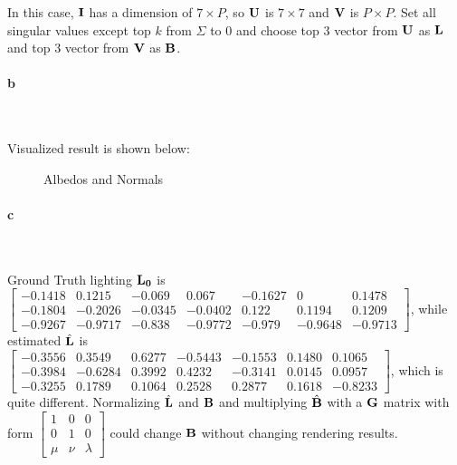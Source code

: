 \documentclass[11pt]{article} \usepackage{fullpage} \usepackage{graphicx} \usepackage{epstopdf} \usepackage{color} \usepackage{psfrag} \usepackage{pdfsync}\usepackage{indentfirst}\usepackage{subfigure}\usepackage{float}\usepackage[section]{placeins}
\begin{document}
In this case, $\bold{I}$ has a dimension of $7\times P$, so $\bold{U}$ is $7\times7$ and $\bold{V}$ is $P\times P$. Set all singular values except top $k$ from $\Sigma$ to $0$ and choose top $3$ vector from $\bold{U}$ as $\bold{L}$ and top $3$ vector from $\bold{V}$ as $\bold{B}$.

\paragraph{b}~{}

Visualized result is shown below:
\begin{figure}[H]
\centering
{}
\caption{Albedos and Normals}
\end{figure}

\paragraph{c}~{}

Ground Truth lighting $\bold{L_0}$ is $\begin{bmatrix} -0.1418 & 0.1215 & -0.069 & 0.067 & -0.1627 & 0 & 0.1478 \\ -0.1804 & -0.2026 & -0.0345 & -0.0402 & 0.122 & 0.1194 & 0.1209 \\ -0.9267 & -0.9717 & -0.838 & -0.9772 & -0.979 & -0.9648 & -0.9713 \end{bmatrix}$, while estimated $\hat{\bold{L}}$ is $\begin{bmatrix} -0.3556 & 0.3549 & 0.6277 & -0.5443 & -0.1553 & 0.1480 & 0.1065 \\ -0.3984 & -0.6284 & 0.3992 & 0.4232 & -0.3141 & 0.0145 & 0.0957 \\ -0.3255 & 0.1789 & 0.1064 & 0.2528 & 0.2877 & 0.1618 & -0.8233 \end{bmatrix}$, which is quite different. Normalizing $\hat{\bold{L}}$ and $\bold{B}$ and multiplying $\hat{\bold{B}}$ with a $\bold{G}$ matrix with form $\begin{bmatrix} 1 & 0 & 0 \\ 0 & 1 & 0 \\ \mu & \nu & \lambda \end{bmatrix}$ could change $\bold{B}$ without changing rendering results.
\end{document}
